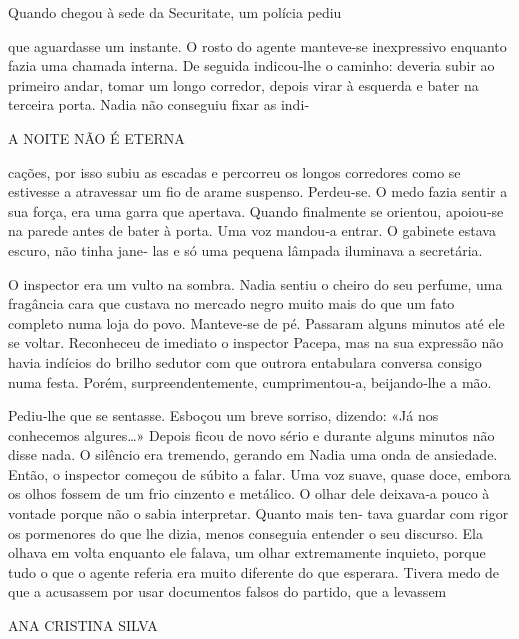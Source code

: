 Quando chegou à sede da Securitate, um polícia pediu

que aguardasse um instante. O rosto do agente manteve‑se inexpressivo
enquanto fazia uma chamada interna. De seguida indicou‑lhe o caminho:
deveria subir ao primeiro andar, tomar um longo corredor, depois virar à
esquerda e bater na terceira porta. Nadia não conseguiu fixar as indi‑

A NOITE NÃO É ETERNA

cações, por isso subiu as escadas e percorreu os longos corredores como
se estivesse a atravessar um fio de arame suspenso. Perdeu‑se. O medo
fazia sentir a sua força, era uma garra que apertava. Quando finalmente
se orientou, apoiou‑se na parede antes de bater à porta. Uma voz
mandou‑a entrar. O gabinete estava escuro, não tinha jane‑ las e só uma
pequena lâmpada iluminava a secretária.

O inspector era um vulto na sombra. Nadia sentiu o cheiro do seu
perfume, uma fragância cara que custava no mercado negro muito mais do
que um fato completo numa loja do povo. Manteve‑se de pé. Passaram
alguns minutos até ele se voltar. Reconheceu de imediato o inspector
Pacepa, mas na sua expressão não havia indícios do brilho sedutor com
que outrora entabulara conversa consigo numa festa. Porém,
surpreendentemente, cumprimentou‑a, beijando‑lhe a mão.

Pediu‑lhe que se sentasse. Esboçou um breve sorriso, dizendo: «Já nos
conhecemos algures\ldots{}» Depois ficou de novo sério e durante alguns
minutos não disse nada. O silêncio era tremendo, gerando em Nadia uma
onda de ansiedade. Então, o inspector começou de súbito a falar. Uma voz
suave, quase doce, embora os olhos fossem de um frio cinzento e
metálico. O olhar dele deixava‑a pouco à vontade porque não o sabia
interpretar. Quanto mais ten‑ tava guardar com rigor os pormenores do
que lhe dizia, menos conseguia entender o seu discurso. Ela olhava em
volta enquanto ele falava, um olhar extremamente inquieto, porque tudo o
que o agente referia era muito diferente do que esperara. Tivera medo de
que a acusassem por usar documentos falsos do partido, que a levassem

ANA CRISTINA SILVA

